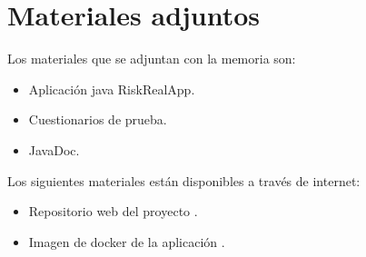 \section{Materiales adjuntos}

Los materiales que se adjuntan con la memoria son:

\begin{itemize}
	\item Aplicación java RiskRealApp.
	\item Cuestionarios de prueba.
	\item JavaDoc.
\end{itemize}

Los siguientes materiales están disponibles a través de internet:

\begin{itemize}
	\item Repositorio web del proyecto \cite{github:repo}.
	\item Imagen de docker de la aplicación \cite{github:dockerImage}.
\end{itemize}